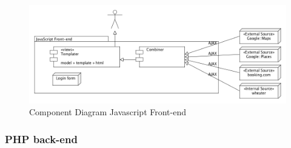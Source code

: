 \documentclass[a4paper,10pt]{article}
\begin{document}
		\begin{figure}[ht!]
		\centering
		\includegraphics[width=14cm]{componentDiagram_frontend.png}
		\caption{Component Diagram Javascript Front-end \label{componentdiagramfrontend}}
		\end{figure}
	
		\subsubsection{PHP back-end}
\end{document}
